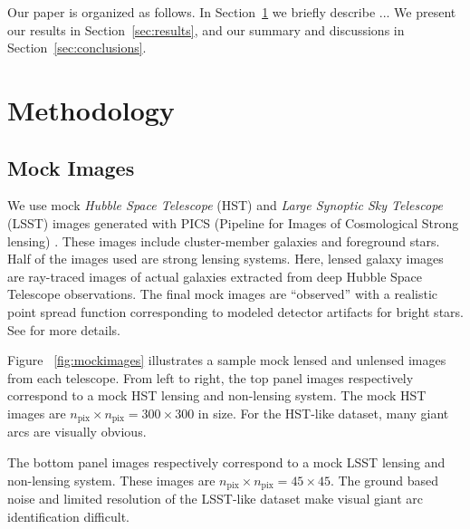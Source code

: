 \documentclass{emulateapj}
\begin{document}
Our paper is organized as follows.  In Section~\ref{sec:methods} we
briefly describe ...  We present our results in
Section~\ref{sec:results}, and our summary and discussions in
Section~\ref{sec:conclusions}.

\section{Methodology}
\label{sec:methods}

\subsection{Mock Images}

We use mock {\em Hubble Space Telescope} (HST) and {\em Large Synoptic
  Sky Telescope} (LSST) images generated with PICS (Pipeline for
Images of Cosmological Strong lensing) \citep{li_etal16}.  These
images include cluster-member galaxies and foreground stars.  Half of
the images used are strong lensing systems.  Here, lensed galaxy
images are ray-traced images of actual galaxies extracted from deep
Hubble Space Telescope observations.  The final mock images are
``observed'' with a realistic point spread function corresponding to
modeled detector artifacts for bright stars.  See \cite{li_etal16} for
more details.

Figure ~\ref{fig:mockimages} illustrates a sample mock lensed and
unlensed images from each telescope.  From left to right, the top
panel images respectively correspond to a mock HST lensing and
non-lensing system. The mock HST images are $n_\text{pix}\times
n_\text{pix}=300\times300$ in size.  For the HST-like dataset, many
giant arcs are visually obvious.

The bottom panel images respectively correspond to a mock LSST lensing
and non-lensing system.  These images are $n_\text{pix}\times
n_\text{pix}=45\times45$.  The ground based noise and limited
resolution of the LSST-like dataset make visual giant arc
identification difficult.
\end{document}
